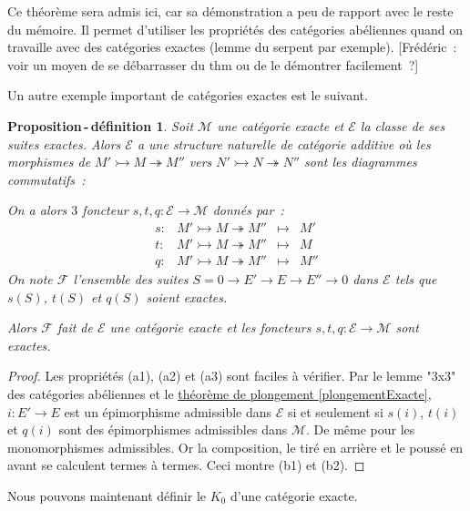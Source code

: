 \documentclass{amsart}
\newcommand{\sref}[2]{\hyperref[#2]{#1 \ref*{#2}}}
\theoremstyle{plain}
\newtheorem{propdefi}[theo]{Proposition\,-\,définition}
\theoremstyle{definition}
\theoremstyle{remark}
\newcommand{\M}{\mathcal{M}}
\newcommand{\E}{\mathcal{E}}
\newcommand{\ra}{\rightarrow}
\newcommand{\exa}[3]{0\ra {#1}\ra {#2}\ra {#3}\ra 0}
\newcommand{\exac}[3]{{#1}\rightarrowtail {#2}\twoheadrightarrow {#3}}
\begin{document}
Ce théorème sera admis ici, car sa démonstration a peu de rapport avec le reste du mémoire. Il permet d'utiliser les propriétés des catégories
abéliennes quand on travaille avec des catégories exactes (lemme du serpent par exemple).
[Frédéric~: voir un moyen de se débarrasser du thm ou de le démontrer facilement~?]

Un autre exemple important de catégories exactes est le suivant.

\begin{propdefi}
  Soit $\M$ une catégorie exacte et $\E$ la classe de ses suites exactes. Alors $\E$ a une structure naturelle de catégorie additive où les
  morphismes de $\exac{M'}{M}{M''}$ vers $\exac{N'}{N}{N''}$ sont les diagrammes commutatifs~:
  \begin{center}
  \end{center}
  On a alors $3$ foncteur $s,t,q:\E\ra \M$ donnés par~:
  \[
    \begin{array}{llcl}
      s:&\exac{M'}{M}{M''}&\mapsto& M' \\
      t:&\exac{M'}{M}{M''}&\mapsto& M  \\
      q:&\exac{M'}{M}{M''}&\mapsto& M''
    \end{array}
  \]
  On note $\mathcal{F}$ l'ensemble des suites $S=\exa{E'}{E}{E''}$ dans $\E$ tels que $s(S)$, $t(S)$
  et $q(S)$ soient exactes.
  
  Alors $\mathcal{F}$ fait de $\E$ une catégorie exacte et les foncteurs $s,t,q:\E\ra \M$ sont exactes.
\end{propdefi}

\begin{proof}
  Les propriétés (a1), (a2) et (a3) sont faciles à vérifier.
  Par le lemme "3x3" des catégories abéliennes et le \sref{théorème de plongement}{plongementExacte},
  $i:E'\ra E$ est un épimorphisme admissible dans $\E$ si et seulement si $s(i)$, $t(i)$ et $q(i)$ sont des épimorphismes 
  admissibles dans $\M$. De même pour les monomorphismes admissibles. Or la composition, le tiré en arrière et le poussé en avant se calculent
  termes à termes. Ceci montre (b1) et (b2). 
\end{proof}

Nous pouvons maintenant définir le $K_0$ d'une catégorie exacte.
\end{document}

